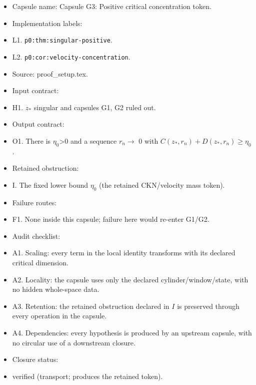 \documentclass[11pt]{amsart}
\begin{document}
\begin{itemize}
  \item Capsule name: Capsule G3: Positive critical concentration token.
  \item Implementation labels:
  \item L1. \texttt{p0:thm:singular-positive}.
  \item L2. \texttt{p0:cor:velocity-concentration}.
  \item Source: proof\_setup.tex.
  \item Input contract:
  \item H1. $z_*$ singular and capsules G1, G2 ruled out.
  \item Output contract:
  \item O1. There is $\eta_0$>0 and a sequence $r_n \to$ 0 with $C(z_*,r_n)+D(z_*,r_n) \ge \eta_0$.
  \item Retained obstruction:
  \item I. The fixed lower bound $\eta_0$ (the retained CKN/velocity mass token).
  \item Failure routes:
  \item F1. None inside this capsule; failure here would re-enter G1/G2.
  \item Audit checklist:
  \item A1. Scaling: every term in the local identity transforms with its declared critical dimension.
  \item A2. Locality: the capsule uses only the declared cylinder/window/state, with no hidden whole-space data.
  \item A3. Retention: the retained obstruction declared in $I$ is preserved through every operation in the capsule.
  \item A4. Dependencies: every hypothesis is produced by an upstream capsule, with no circular use of a downstream closure.
  \item Closure status:
  \item verified (transport; produces the retained token).
\end{itemize}
\end{document}
